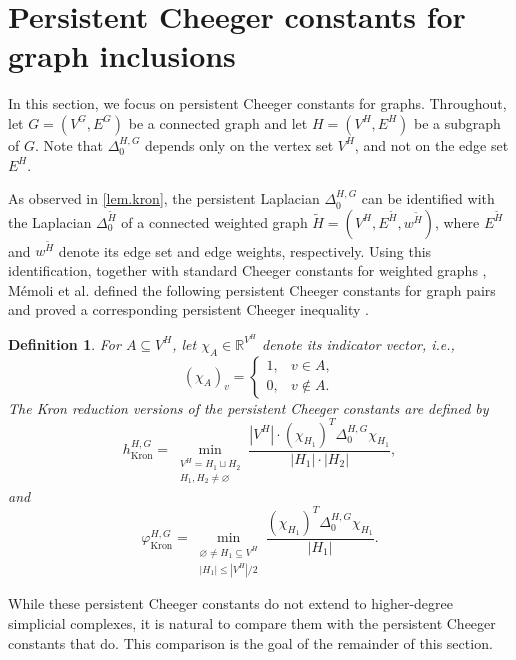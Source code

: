 \documentclass{article}
\newtheorem{definition}{Definition}[section]
\begin{document}
\section{Persistent Cheeger constants for graph inclusions}
\label{sec.graph.comparisons}
In this section, we focus on persistent Cheeger constants for graphs. Throughout, let \(G=(V^G,E^G)\) be a connected graph and let \(H=(V^H,E^H)\) be a subgraph of \(G\). Note that \(\Delta_0^{H,G}\) depends only on the vertex set \(V^H\), and not on the edge set \(E^H\).

As observed in \cref{lem.kron}, the persistent Laplacian \(\Delta_0^{H,G}\) can be identified with the Laplacian \(\Delta_0^{\widetilde H}\) of a connected weighted graph \(\widetilde H=(V^H,E^{\widetilde H},w^{\widetilde H})\), where \(E^{\widetilde H}\) and \(w^{\widetilde H}\) denote its edge set and edge weights, respectively. Using this identification,
together with standard Cheeger constants for weighted graphs \cite{MR1395858,MR1421568},
M\'{e}moli et al. defined the following persistent Cheeger constants for graph pairs \cite[Definition~4.18]{pers_lap} and proved a corresponding persistent Cheeger inequality \cite[Theorem 4.21]{pers_lap}.

\begin{definition}\label{def:kron_cheeger}
For \(A\subseteq V^H\), let \(\chi_A\in\mathbb{R}^{V^H}\) denote its indicator vector, i.e.,
\[
(\chi_A)_v=
\begin{cases}
1, & v\in A,\\
0, & v\notin A.
\end{cases}
\]
The Kron reduction versions of the persistent Cheeger constants are defined by
\begin{equation}\label{eq:kron_cheeger_asymm}
h_{\operatorname{Kron}}^{H,G}
=
\min_{\substack{V^H=H_1\sqcup H_2\\ H_1,H_2\neq\varnothing}}
\frac{|V^H|\cdot(\chi_{H_1})^T\Delta_0^{H,G}\chi_{H_1}}{|H_1|\cdot |H_2|},
\end{equation}
and
\begin{equation}\label{eq:kron_cheeger_symm}
\varphi_{\operatorname{Kron}}^{H,G}
=
\min_{\substack{\varnothing\neq H_1\subseteq V^H\\ |H_1|\leq |V^H|/2}}
\frac{(\chi_{H_1})^T\Delta_0^{H,G}\chi_{H_1}}{|H_1|}.
\end{equation}
\end{definition}
While these persistent Cheeger constants do not extend to higher-degree simplicial complexes, it is natural to compare them with the persistent Cheeger constants that do. This comparison is the goal of the remainder of this section.
\end{document}
